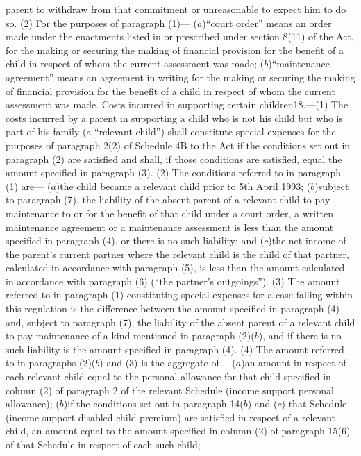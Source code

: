 \documentclass[a4paper]{article}
\begin{document}
parent to withdraw from that commitment or unreasonable to expect him to do so.
(2) For the purposes of paragraph (1)—
($a$)“court order” means an order made under the enactments listed in or
prescribed under section 8(11) of the Act, for the making or securing the making
of financial provision for the benefit of a child in respect of whom the current
assessment was made;
($b$)“maintenance agreement” means an agreement in writing for the making or
securing the making of financial provision for the benefit of a child in respect
of whom the current assessment was made.
Costs incurred in supporting certain children18.—(1) The costs incurred by a
parent in supporting a child who is not his child but who is part of his family
(a “relevant child”) shall constitute special expenses for the purposes of
paragraph 2(2) of Schedule 4B to the Act if the conditions set out in paragraph
(2) are satisfied and shall, if those conditions are satisfied, equal the amount
specified in paragraph (3).
(2) The conditions referred to in paragraph (1) are—
($a$)the child became a relevant child prior to 5th April 1993;
($b$)subject to paragraph (7), the liability of the absent parent of a relevant
child to pay maintenance to or for the benefit of that child under a court
order, a written maintenance agreement or a maintenance assessment is less than
the amount specified in paragraph (4), or there is no such liability; and
($c$)the net income of the parent’s current partner where the relevant child is
the child of that partner, calculated in accordance with paragraph (5), is less
than the amount calculated in accordance with paragraph (6) (“the partner’s
outgoings”).
(3) The amount referred to in paragraph (1) constituting special expenses for a
case falling within this regulation is the difference between the amount
specified in paragraph (4) and, subject to paragraph (7), the liability of the
absent parent of a relevant child to pay maintenance of a kind mentioned in
paragraph (2)($b$), and if there is no such liability is the amount specified in
paragraph (4).
(4) The amount referred to in paragraphs (2)($b$) and (3) is the aggregate of—
($a$)an amount in respect of each relevant child equal to the personal allowance
for that child specified in column (2) of paragraph 2 of the relevant Schedule
(income support personal allowance);
($b$)if the conditions set out in paragraph 14($b$) and ($c$) that Schedule (income
support disabled child premium) are satisfied in respect of a relevant child, an
amount equal to the amount specified in column (2) of paragraph 15(6) of that
Schedule in respect of each such child;
\end{document}
